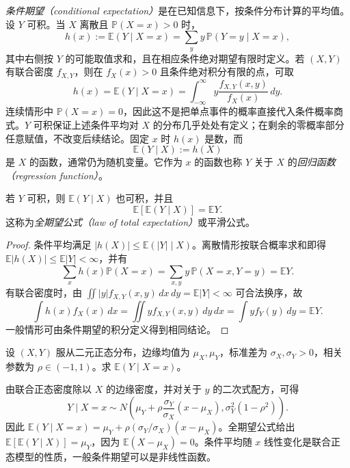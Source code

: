 \emph{条件期望（conditional expectation）}是在已知信息下，按条件分布计算的平均值。设 $Y$ 可积。当 $X$ 离散且 $\mathbb P(X=x)>0$ 时，
\[
  h(x):=\mathbb E(Y\mid X=x)=\sum_y y\,\mathbb P(Y=y\mid X=x),
\]
其中右侧按 $Y$ 的可能取值求和，且在相应条件绝对期望有限时定义。若 $(X,Y)$ 有联合密度 $f_{X,Y}$，则在 $f_X(x)>0$ 且条件绝对积分有限的点，可取
\begin{equation}
  h(x)=\mathbb E(Y\mid X=x)
    =\int_{-\infty}^{\infty}y\frac{f_{X,Y}(x,y)}{f_X(x)}\,dy.
  \label{eq:study-conditional-mean-density}
\end{equation}
连续情形中 $\mathbb P(X=x)=0$，因此这不是把单点事件的概率直接代入条件概率商式。$Y$ 可积保证上述条件平均对 $X$ 的分布几乎处处有定义；在剩余的零概率部分任意赋值，不改变后续结论。固定 $x$ 时 $h(x)$ 是数，而
\[
  \mathbb E(Y\mid X):=h(X)
\]
是 $X$ 的函数，通常仍为随机变量。它作为 $x$ 的函数也称 $Y$ 关于 $X$ 的\emph{回归函数（regression function）}。

\begin{theorem}
\label{thm:study-total-expectation}
若 $Y$ 可积，则 $\mathbb E(Y\mid X)$ 也可积，并且
\begin{equation}
  \mathbb E[\mathbb E(Y\mid X)]=\mathbb E Y.
  \label{eq:study-total-expectation}
\end{equation}
这称为\emph{全期望公式（law of total expectation）}或平滑公式。
\end{theorem}

\begin{proof}
条件平均满足 $|h(X)|\le\mathbb E(|Y|\mid X)$。离散情形按联合概率求和即得 $\mathbb E|h(X)|\le\mathbb E|Y|<\infty$，并有
\[
  \sum_xh(x)\mathbb P(X=x)
    =\sum_{x,y}y\,\mathbb P(X=x,Y=y)=\mathbb E Y.
\]
有联合密度时，由 $\iint|y|f_{X,Y}(x,y)\,dx\,dy=\mathbb E|Y|<\infty$ 可合法换序，故
\[
  \int h(x)f_X(x)\,dx
    =\iint y f_{X,Y}(x,y)\,dy\,dx
    =\int y f_Y(y)\,dy=\mathbb E Y.
\]
一般情形可由条件期望的积分定义得到相同结论。
\end{proof}

\begin{example}
\label{ex:study-normal-conditional-mean}
设 $(X,Y)$ 服从二元正态分布，边缘均值为 $\mu_X,\mu_Y$，标准差为 $\sigma_X,\sigma_Y>0$，相关参数为 $\rho\in(-1,1)$。求 $\mathbb E(Y\mid X=x)$。
\end{example}

\begin{solve}
由联合正态密度除以 $X$ 的边缘密度，并对关于 $y$ 的二次式配方，可得
\[
  Y\mid X=x\sim N\left(\mu_Y+\rho\frac{\sigma_Y}{\sigma_X}(x-\mu_X),
                       \sigma_Y^2(1-\rho^2)\right).
\]
因此 $\mathbb E(Y\mid X=x)=\mu_Y+\rho(\sigma_Y/\sigma_X)(x-\mu_X)$。全期望公式给出 $\mathbb E[\mathbb E(Y\mid X)]=\mu_Y$，因为 $\mathbb E(X-\mu_X)=0$。条件平均随 $x$ 线性变化是联合正态模型的性质，一般条件期望可以是非线性函数。
\end{solve}

